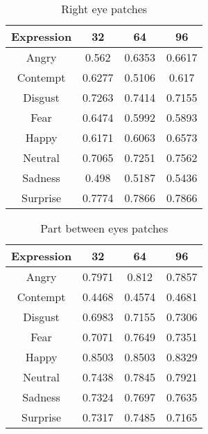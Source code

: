 \begin{table}
\caption{Right eye patches}
\label{table:right_eye}

\begin{tabular}{| c | c | c | c |}
\hline
Expression & 32 &  64  & 96  \\

\hline
Angry    & 0.562 & 0.6353 & 0.6617 \\
Contempt & 0.6277 & 0.5106 & 0.617 \\ 
Disgust	 & 0.7263 & 0.7414 & 0.7155 \\
Fear	 & 0.6474 & 0.5992 & 0.5893 \\
Happy	 & 0.6171 & 0.6063 & 0.6573 \\
Neutral  & 0.7065 & 0.7251 & 0.7562 \\
Sadness  & 0.498 & 0.5187 & 0.5436 \\
Surprise & 0.7774 & 0.7866 & 0.7866 \\

\hline
\end{tabular}
\end{table}

\begin{table}
\caption{Part between eyes patches}
\label{table:between_eyes}

\begin{tabular}{| c | c | c | c |}
\hline
Expression & 32 &  64  & 96  \\

\hline
Angry & 0.7971 & 0.812 & 0.7857 \\
Contempt & 0.4468 & 0.4574 & 0.4681 \\
Disgust & 0.6983 & 0.7155 & 0.7306 \\
Fear & 0.7071 & 0.7649 & 0.7351 \\
Happy & 0.8503 & 0.8503 & 0.8329 \\
Neutral & 0.7438 & 0.7845 & 0.7921 \\
Sadness & 0.7324 & 0.7697 & 0.7635 \\
Surprise & 0.7317 & 0.7485 & 0.7165 \\

\hline
\end{tabular}
\end{table}


